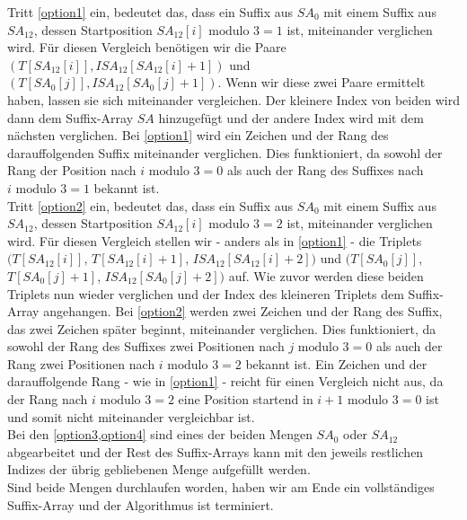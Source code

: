 Tritt \cref{option1} ein, bedeutet das, dass ein Suffix aus $SA_{0}$ mit einem Suffix aus $SA_{12}$, dessen Startposition $SA_{12}[i] \text{ modulo } 3 = 1$ ist, miteinander verglichen wird. Für diesen Vergleich benötigen wir die Paare $(T[SA_{12}[i]], ISA_{12}[SA_{12}[i]+1])$ und $(T[SA_{0}[j]], ISA_{12}[SA_{0}[j]+1])$. Wenn wir diese zwei Paare ermittelt haben, lassen sie sich miteinander vergleichen. Der kleinere Index von beiden wird dann dem Suffix-Array $SA$ hinzugefügt und der andere Index wird mit dem nächsten verglichen. Bei \cref{option1} wird ein Zeichen und der Rang des darauffolgenden Suffix miteinander verglichen. Dies funktioniert, da sowohl der Rang der Position nach $i \text{ modulo } 3 = 0$ als auch der Rang des Suffixes nach $i \text{ modulo } 3 = 1$ bekannt ist. \\
Tritt \cref{option2} ein, bedeutet das, dass ein Suffix aus $SA_{0}$ mit einem Suffix aus $SA_{12}$, dessen Startposition $SA_{12}[i] \text{ modulo } 3 = 2$ ist, miteinander verglichen wird. Für diesen Vergleich stellen wir - anders als in \cref{option1} - die Triplets $(T[SA_{12}[i]]$, $T[SA_{12}[i]+1]$, $ISA_{12}[SA_{12}[i]+2])$ und $(T[SA_{0}[j]]$, $T[SA_{0}[j]+1]$, $ISA_{12}[SA_{0}[j]+2])$ auf. Wie zuvor werden diese beiden Triplets nun wieder verglichen und der Index des kleineren Triplets dem Suffix-Array angehangen. Bei \cref{option2} werden zwei Zeichen und der Rang des Suffix, das zwei Zeichen später beginnt, miteinander verglichen. Dies funktioniert, da sowohl der Rang des Suffixes zwei Positionen nach $j \text{ modulo } 3 = 0$ als auch der Rang zwei Positionen nach $i \text{ modulo } 3 = 2$ bekannt ist. Ein Zeichen und der darauffolgende Rang - wie in \cref{option1} - reicht für einen Vergleich nicht aus, da der Rang nach $i \text{ modulo } 3 = 2$ eine Position startend in $i+1 \text{ modulo } 3 = 0$ ist und somit nicht miteinander vergleichbar ist.\\
Bei den \cref{option3,option4} sind eines der beiden Mengen $SA_{0}$ oder $SA_{12}$ abgearbeitet und der Rest des Suffix-Arrays kann mit den jeweils restlichen Indizes der übrig gebliebenen Menge aufgefüllt werden.\\
Sind beide Mengen durchlaufen worden, haben wir am Ende ein vollständiges Suffix-Array und der Algorithmus ist terminiert.


